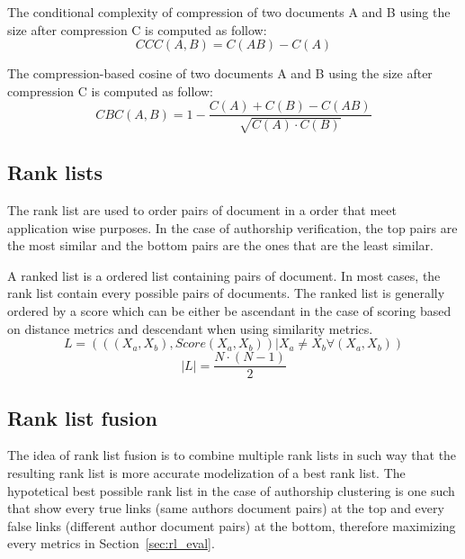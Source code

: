 \begin{definition}
  The conditional complexity of compression of two documents A and B using the size after compression C is computed as follow:
  \begin{equation}
    CCC(A, B) = C(AB) - C(A)
  \end{equation}
\end{definition}

\begin{definition}
  The compression-based cosine of two documents A and B using the size after compression C is computed as follow:
  \begin{equation}
    CBC(A, B) = 1 - \frac{C(A) + C(B) - C(AB)}{\sqrt{C(A) \cdot C(B)}}
  \end{equation}
\end{definition}

\subsection{Rank lists}

The rank list are used to order pairs of document in a order that meet application wise purposes.
In the case of authorship verification, the top pairs are the most similar and the bottom pairs are the ones that are the least similar.

\begin{definition}
  A ranked list is a ordered list containing pairs of document.
  In most cases, the rank list contain every possible pairs of documents.
  The ranked list is generally ordered by a score which can be either be ascendant in the case of scoring based on distance metrics and descendant when using similarity metrics.
  \begin{equation}
    L = (((X_a, X_b), Score(X_a, X_b)) | X_a \neq X_b \forall (X_a, X_b))
  \end{equation}
  \begin{equation}
    |L| = \frac{N \cdot (N - 1)}{2}
  \end{equation}
\end{definition}

\subsection{Rank list fusion}

The idea of rank list fusion is to combine multiple rank lists in such way that the resulting rank list is more accurate modelization of a best rank list.
The hypotetical best possible rank list in the case of authorship clustering is one such that show every true links (same authors document pairs) at the top and every false links (different author document pairs) at the bottom, therefore maximizing every metrics in Section~\ref{sec:rl_eval}.

